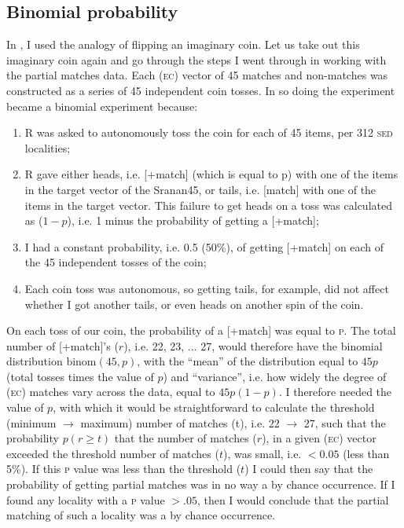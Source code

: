 \subsection{Binomial probability}\label{4.2.2}
In , I used the analogy of flipping an imaginary coin. Let us take out this imaginary coin again and go through the steps I went through in working with the partial matches data. Each (\textsc{ec}) vector of 45 matches and non-matches was constructed as a series of 45 independent coin tosses. In so doing the experiment became a binomial experiment because:

\begin{enumerate}
\item {R was asked to autonomously toss the coin for each of 45 items, per 312 \textsc{sed} localities;}
\item{R gave either heads, i.e. [+match] (which is equal to p) with one of the items in the target vector of the Sranan45, or tails, i.e. [\textminus{}match] with one of the items in the target vector. This failure to get heads on a toss was calculated as ($1-p$), i.e. 1 minus the probability of getting a [+match];}
\item{I had a constant probability, i.e. 0.5 (50\%), of getting [+match] on each of the 45 independent tosses of the coin;}
\item{Each coin toss was autonomous, so getting tails, for example, did not affect whether I got another tails, or even heads on another spin of the coin.}
\end{enumerate}

On each toss of our coin, the probability of a [+match] was equal to \textsc{p}. The total number of [+match]'s ($r$), i.e. 22, 23, ... 27, would therefore have the binomial distribution $\text{binom}(45, p)$, with the ``mean'' of the distribution equal to $45p$ (total tosses times the value of $p$) and ``variance'', i.e. how widely the degree of (\textsc{ec}) matches vary across the data, equal to $45p(1-p)$. I therefore needed the value of $p$, with which it would be straightforward to calculate the threshold (minimum $\rightarrow$ maximum) number of matches (t), i.e. 22 $\rightarrow$ 27, such that the probability $p(r \geq t)$ that the number of matches ($r$), in a given (\textsc{ec}) vector exceeded the threshold number of matches ($t$), was small, i.e. $<0.05$ (less than 5\%). If this \textsc{p} value was less than the threshold ($t$) I could then say that the probability of getting partial matches was in no way a by chance occurrence. If I found any locality with a \textsc{p} value $>.05$, then I would conclude that the partial matching of such a locality was a by chance occurrence.

